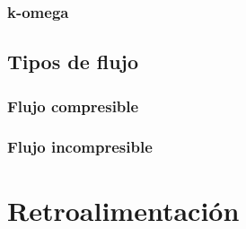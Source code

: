 \subsubsection{k-omega}

\subsection{Tipos de flujo}
\subsubsection{Flujo compresible}
\subsubsection{Flujo incompresible}

\section{Retroalimentación}


